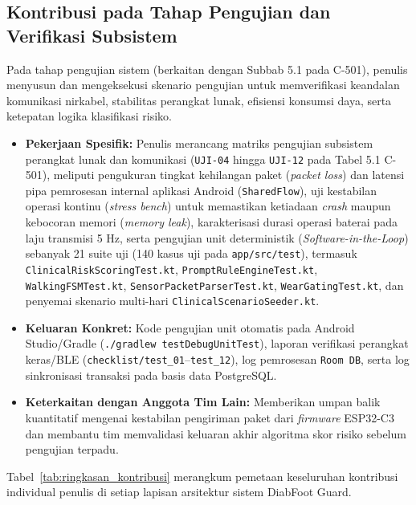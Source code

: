 \subsection{Kontribusi pada Tahap Pengujian dan Verifikasi Subsistem}
\label{subsec:kontribusi_tahap5}

Pada tahap pengujian sistem (berkaitan dengan Subbab 5.1 pada C-501), penulis menyusun dan mengeksekusi skenario pengujian untuk memverifikasi keandalan komunikasi nirkabel, stabilitas perangkat lunak, efisiensi konsumsi daya, serta ketepatan logika klasifikasi risiko.

\begin{itemize}
    \item \textbf{Pekerjaan Spesifik:} Penulis merancang matriks pengujian subsistem perangkat lunak dan komunikasi (\texttt{UJI-04} hingga \texttt{UJI-12} pada Tabel 5.1 C-501), meliputi pengukuran tingkat kehilangan paket (\textit{packet loss}) dan latensi pipa pemrosesan internal aplikasi Android (\texttt{SharedFlow}), uji kestabilan operasi kontinu (\textit{stress bench}) untuk memastikan ketiadaan \textit{crash} maupun kebocoran memori (\textit{memory leak}), karakterisasi durasi operasi baterai pada laju transmisi 5 Hz, serta pengujian unit deterministik (\textit{Software-in-the-Loop}) sebanyak 21 suite uji (140 kasus uji pada \texttt{app/src/test}), termasuk \texttt{ClinicalRiskScoringTest.kt}, \texttt{PromptRuleEngineTest.kt}, \texttt{WalkingFSMTest.kt}, \texttt{SensorPacketParserTest.kt}, \texttt{WearGatingTest.kt}, dan penyemai skenario multi-hari \texttt{ClinicalScenarioSeeder.kt}.
    \item \textbf{Keluaran Konkret:} Kode pengujian unit otomatis pada Android Studio/Gradle (\texttt{./gradlew testDebugUnitTest}), laporan verifikasi perangkat keras/BLE (\texttt{checklist/test\_01}--\texttt{test\_12}), log pemrosesan \texttt{Room DB}, serta log sinkronisasi transaksi pada basis data PostgreSQL.
    \item \textbf{Keterkaitan dengan Anggota Tim Lain:} Memberikan umpan balik kuantitatif mengenai kestabilan pengiriman paket dari \textit{firmware} ESP32-C3 dan membantu tim memvalidasi keluaran akhir algoritma skor risiko sebelum pengujian terpadu.
\end{itemize}

Tabel~\ref{tab:ringkasan_kontribusi} merangkum pemetaan keseluruhan kontribusi individual penulis di setiap lapisan arsitektur sistem DiabFoot Guard.

